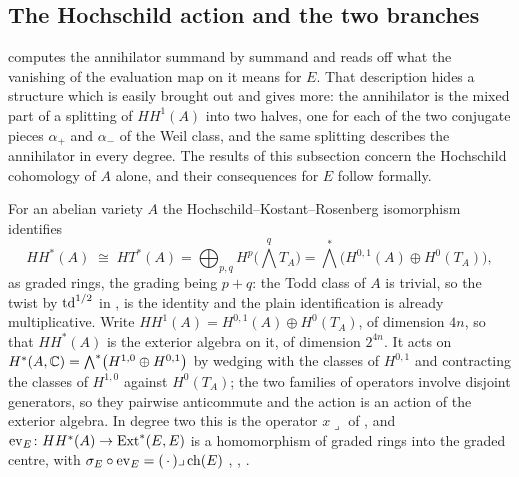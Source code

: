 \subsection{The Hochschild action and the two branches}

 computes the annihilator summand by summand and reads off
what the vanishing of the evaluation map on it means for $E$. That
description hides a structure which is easily brought out and gives more:
the annihilator is the mixed part of a splitting of $HH^{1}(A)$ into two
halves, one for each of the two conjugate pieces $\alpha_{+}$ and
$\alpha_{-}$ of the Weil class, and the same splitting describes the
annihilator in every degree. The results of this subsection concern the
Hochschild cohomology of $A$ alone, and their consequences for $E$ follow
formally.

\begin{setupenv}\label{setup:hh}
For an abelian variety $A$ the Hoch\-schild--Kostant--Rosen\-berg isomorphism
identifies
\[
  HH^{*}(A)\;\cong\;HT^{*}(A)=\bigoplus_{p,q}H^{p}\bigl(\textstyle\bigwedge^{q}T_{A}\bigr)
  =\textstyle\bigwedge^{*}\bigl(H^{0,1}(A)\oplus H^{0}(T_{A})\bigr),
\]
as graded rings, the grading being $p+q$: the Todd class of $A$ is trivial,
so the twist by $\operatorname{td}^{1/2}$ in \cite{Cal05}, \cite{CRV12} is the identity and
the plain identification is already multiplicative. Write
$HH^{1}(A)=H^{0,1}(A)\oplus H^{0}(T_{A})$, of dimension $4n$, so that
$HH^{*}(A)$ is the exterior algebra on it, of dimension $2^{4n}$. It acts on
$H^{*}(A,\mathbb{C})=\bigwedge^{*}\bigl(H^{1,0}\oplus H^{0,1}\bigr)$ by wedging with
the classes of $H^{0,1}$ and contracting the classes of $H^{1,0}$ against
$H^{0}(T_{A})$; the two families of operators involve disjoint generators, so
they pairwise anticommute and the action is an action of the exterior algebra.
In degree two this is the operator $x\lrcorner$ of , and
$\operatorname{ev}_{E}\colon HH^{*}(A)\to\operatorname{Ext}^{*}(E,E)$ is a homomorphism of
graded rings into the graded centre, with
$\sigma_{E}\circ\operatorname{ev}_{E}=(\,\cdot\,)\lrcorner\operatorname{ch}(E)$
\cite[Section 6]{BF08}, \cite{Cal05}, \cite{CRV12}.
\end{setupenv}

